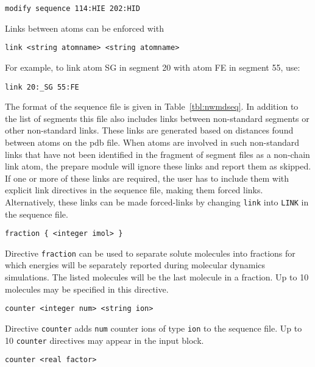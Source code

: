 \begin{verbatim}
modify sequence 114:HIE 202:HID
\end{verbatim}

Links between atoms can be enforced with

\begin{verbatim}
link <string atomname> <string atomname>
\end{verbatim}

For example, to link atom {\rm SG} in segment 20 with atom {\rm FE}
in segment 55, use:

\begin{verbatim}
link 20:_SG 55:FE
\end{verbatim}

\par
The format of the sequence file is given in Table~\ref{tbl:nwmdseq}.
In addition to the list of segments this file also includes links
between non-standard segments or other non-standard links. 
These links are generated based on distances found between
atoms on the pdb file. When atoms are involved in such non-standard 
links that have not been identified in the fragment of segment
files as a non-chain link atom, the prepare module will ignore
these links and report them as skipped. If one or more of these links
are required, the user has to include them with explicit link
directives in the sequence file, making them forced links.
Alternatively, these links can be made forced-links by changing 
\verb+link+ into \verb+LINK+ in the sequence file. 

\begin{verbatim}
fraction { <integer imol> }
\end{verbatim}

Directive \verb+fraction+ can be used to separate solute molecules
into fractions for which energies will be separately reported 
during molecular dynamics simulations. The listed molecules will be
the last molecule in a fraction. Up to 10 molecules may be
specified in this directive.

\begin{verbatim}
counter <integer num> <string ion>
\end{verbatim}

Directive \verb+counter+ adds \verb+num+ counter ions of type
\verb+ion+ to the sequence file. Up to 10 \verb+counter+
directives may appear in the input block.

\begin{verbatim}
counter <real factor>
\end{verbatim}

